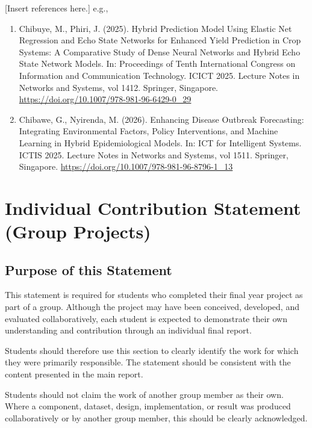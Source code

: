 \documentclass[12pt,a4paper]{report}
\begin{document}
[Insert references here.]
e.g., 
\begin{enumerate}
    \item Chibuye, M., Phiri, J. (2025). Hybrid Prediction Model Using Elastic Net Regression and Echo State Networks for Enhanced Yield Prediction in Crop Systems: A Comparative Study of Dense Neural Networks and Hybrid Echo State Network Models. In: Proceedings of Tenth International Congress on Information and Communication Technology. ICICT 2025. Lecture Notes in Networks and Systems, vol 1412. Springer, Singapore. \url{https://doi.org/10.1007/978-981-96-6429-0_29}
    \item Chibawe, G., Nyirenda, M. (2026). Enhancing Disease Outbreak Forecasting: Integrating Environmental Factors, Policy Interventions, and Machine Learning in Hybrid Epidemiological Models. In: ICT for Intelligent Systems. ICTIS 2025. Lecture Notes in Networks and Systems, vol 1511. Springer, Singapore. \url{https://doi.org/10.1007/978-981-96-8796-1_13}
\end{enumerate}



\appendix

\chapter{Individual Contribution Statement (Group Projects)}

\section*{Purpose of this Statement}

This statement is required for students who completed their final year project as part of a group. Although the project may have been conceived, developed, and evaluated collaboratively, each student is expected to demonstrate their own understanding and contribution through an individual final report.

Students should therefore use this section to clearly identify the work for which they were primarily responsible. The statement should be consistent with the content presented in the main report.

Students should not claim the work of another group member as their own. Where a component, dataset, design, implementation, or result was produced collaboratively or by another group member, this should be clearly acknowledged.
\end{document}
